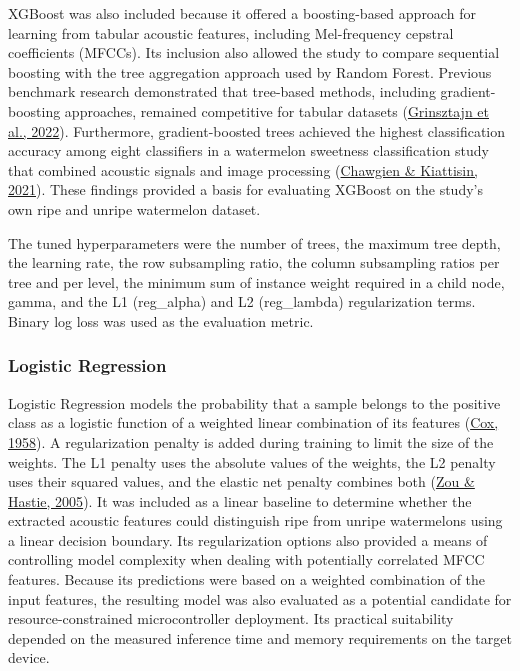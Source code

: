 \begin{thesisprose}
XGBoost was also included because it offered a boosting-based approach for learning from tabular acoustic features, including Mel-frequency cepstral coefficients (MFCCs). Its inclusion also allowed the study to compare sequential boosting with the tree aggregation approach used by Random Forest. Previous benchmark research demonstrated that tree-based methods, including gradient-boosting approaches, remained competitive for tabular datasets (\hyperlink{cite.grinsztajn2022}{Grinsztajn et al., 2022}). Furthermore, gradient-boosted trees achieved the highest classification accuracy among eight classifiers in a watermelon sweetness classification study that combined acoustic signals and image processing (\hyperlink{cite.chawgien2021}{Chawgien \& Kiattisin, 2021}). These findings provided a basis for evaluating XGBoost on the study's own ripe and unripe watermelon dataset.

The tuned hyperparameters were the number of trees, the maximum tree depth, the learning rate, the row subsampling ratio, the column subsampling ratios per tree and per level, the minimum sum of instance weight required in a child node, gamma, and the L1 (reg\_\allowbreak{}alpha) and L2 (reg\_\allowbreak{}lambda) regularization terms. Binary log loss was used as the evaluation metric.

\subsubsection*{Logistic Regression}

Logistic Regression models the probability that a sample belongs to the positive class as a logistic function of a weighted linear combination of its features (\hyperlink{cite.cox1958}{Cox, 1958}). A regularization penalty is added during training to limit the size of the weights. The L1 penalty uses the absolute values of the weights, the L2 penalty uses their squared values, and the elastic net penalty combines both (\hyperlink{cite.zou2005}{Zou \& Hastie, 2005}). It was included as a linear baseline to determine whether the extracted acoustic features could distinguish ripe from unripe watermelons using a linear decision boundary. Its regularization options also provided a means of controlling model complexity when dealing with potentially correlated MFCC features. Because its predictions were based on a weighted combination of the input features, the resulting model was also evaluated as a potential candidate for resource-constrained microcontroller deployment. Its practical suitability depended on the measured inference time and memory requirements on the target device.


\end{thesisprose}
